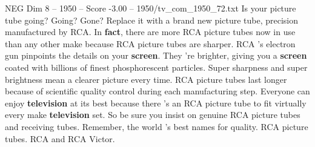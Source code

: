\begin{textsample}{NEG Dim 8 – 1950 – Score -3.00 – 1950/tv\_com\_1950\_72.txt}  \label{ex:f8_neg_081}
Is your picture tube going?
Going?
Gone?
Replace it with a brand new picture tube, precision manufactured by RCA.
In \textbf{fact}, there are more RCA picture tubes now in use than any other make because RCA picture tubes are sharper.
RCA 's electron gun pinpoints the details on your \textbf{screen}.
They 're brighter, giving you a \textbf{screen} coated with billions of finest phosphorescent particles.
Super sharpness and super brightness mean a clearer picture every time.
RCA picture tubes last longer because of scientific quality control during each manufacturing step.
Everyone can enjoy \textbf{television} at its best because there 's an RCA picture tube to fit virtually every make \textbf{television} set.
So be sure you insist on genuine RCA picture tubes and receiving tubes.
Remember, the world 's best names for quality.
RCA picture tubes.
RCA and RCA Victor.

\end{textsample}
